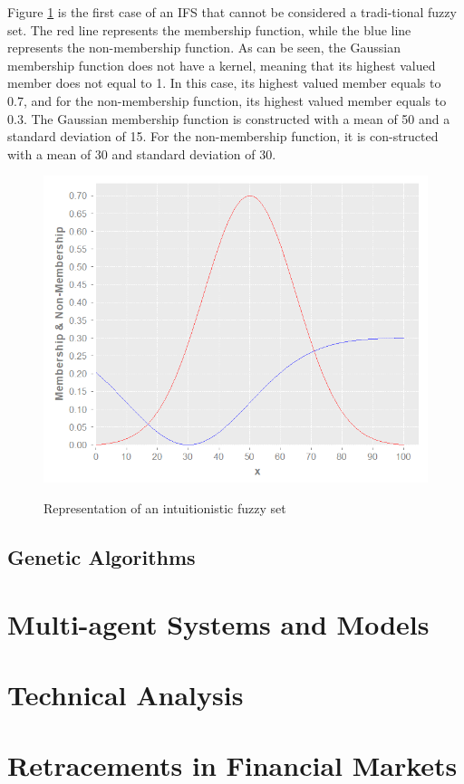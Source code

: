 Figure \ref{figure:example-of-ifs} is the first case of an IFS that cannot be considered a tradi-tional fuzzy set. The red line represents the membership function, while the blue line represents the non-membership function. As can be seen, the Gaussian membership function does not have a kernel, meaning that its highest valued member does not equal to 1. In this case, its highest valued member equals to 0.7, and for the non-membership function, its highest valued member equals to 0.3. The Gaussian membership function is constructed with a mean of 50 and a standard deviation of 15. For the non-membership function, it is con-structed with a mean of 30 and standard deviation of 30.

\begin{figure}
\caption{Representation of an intuitionistic fuzzy set}
\centering
\includegraphics[width=1.0\textwidth]{img/example-of-ifs.png}
\label{figure:example-of-ifs}
\end{figure}

\subsection{Genetic Algorithms}
\label{subsection:genetic-algorithms}

\section{Multi-agent Systems and Models}
\label{section:multi-agent-systems-and-models}

\section{Technical Analysis}
\label{section:technical-analysis}

\section{Retracements in Financial Markets}
\label{section:retracements-in-financial-markets}

